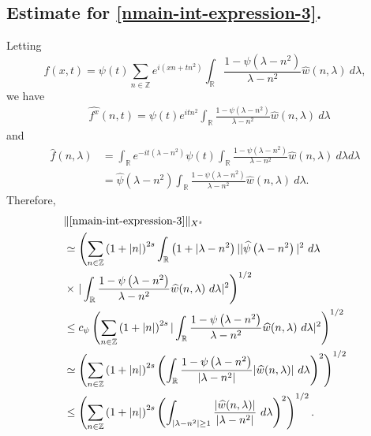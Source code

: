 \documentclass[12pt,reqno]{amsart}
\numberwithin{equation}{section}  %
\newcommand{\rr}{\mathbb{R}}
\newcommand{\zz}{\mathbb{Z}}
\newcommand{\wh}{\widehat}
\begin{document}
\subsection{Estimate for \eqref{nmain-int-expression-3}.}
Letting $$f(x,t) = \psi(t) \sum_{n \in \zz} e^{i\left( xn + tn^{2} \right)} 
\int_\rr \frac{1 - \psi\left( \lambda - n^{2} \right)}{\lambda - n^{2}} 
\wh{w} \left( n, \lambda \right) \ d \lambda,$$ we have
%
%
\begin{equation*}
	\begin{split}
		& \wh{f^x}(n, t) = \psi(t) e^{itn^{2}} \int_\rr
		\frac{1 - \psi\left( \lambda - n^{2} \right)}{\lambda - n^{2}} 
		\wh{w}(n, \lambda) \ d \lambda
	\end{split}
\end{equation*}
and
\begin{equation*}
	\begin{split}
		 \wh{f}\left( n, \lambda \right)
		 & = \int_\rr e^{-it\left( \lambda - n^{2} 
		\right)} \psi(t) \int_\rr \frac{1 - \psi\left( 
		\lambda - n^{2} 
		\right)}{\lambda - n^{2}} \wh{w}(n, \lambda) \ d \lambda d \lambda
		\\
    & = \wh{\psi}\left( \lambda - n^{2} \right) \int_\rr 
		\frac{1 - \psi\left( 
		\lambda - n^{2} 
		\right)}{\lambda - n^{2}} \wh{w}(n, \lambda) \ d \lambda.
	\end{split}
\end{equation*}
Therefore,
%
%
\begin{equation}
  \label{niu}
	\begin{split}
		& \| \eqref{nmain-int-expression-3} \|_{X^s} 
		\\
		& \simeq \left( \sum_{n \in \zz} \left (1 + |n| \right )^{2s} \int_\rr \left( 1 + | \lambda - n^{2
    } \right ) | | \wh{\psi}\left( \lambda - n^{2} \right) |^2 \ d \lambda
		\right.
		\\
		& \times \left . |
		\int_\rr \frac{1 - \psi\left( \lambda - n^{2} \right)}{\lambda -
		n^{2}} \wh{w}(n, \lambda) \ d \lambda |^2  \right)^{1/2}
		\\
    & \le c_{\psi}\left( \sum_{n \in \zz} \left (1 + |n| \right )^{2s} | \int_\rr
		\frac{1 - \psi\left( \lambda - n^{2} \right)}{\lambda - n^{2}}
		\wh{w}(n, \lambda) \ d\lambda |^2 \right)^{1/2}
		\\
		& \simeq \left( \sum_{n \in \zz} \left (1 + |n| \right )^{2s}  \left ( \int_\rr
		\frac{1 - \psi\left( \lambda - n^{2} \right)}{|\lambda - n^{2}|}
		|\wh{w}(n, \lambda) | \ d\lambda \right )^2 \right)^{1/2}
		\\
		& \le \left( \sum_{n \in \zz} \left (1 + |n| \right )^{2s}  \left ( \int_{| \lambda - 
		n^{2} | \ge 1}
		\frac{|\wh{w}(n, \lambda) | }{|\lambda - n^{2}|}
		\ d\lambda \right )^2 \right)^{1/2}.
	\end{split}
\end{equation}
\end{document}
